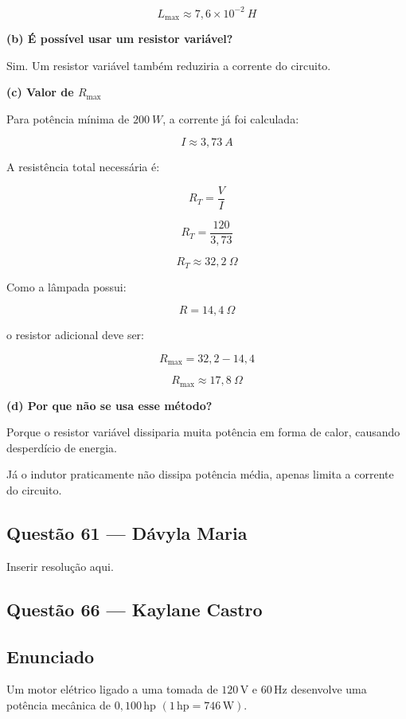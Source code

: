 \documentclass[12pt,a4paper]{article}
\begin{document}
\[
L_{\max}\approx7,6\times10^{-2}\ H
\]

\vspace{0.5cm}

\textbf{(b) É possível usar um resistor variável?}

Sim. Um resistor variável também reduziria a corrente do circuito.

\vspace{0.5cm}

\textbf{(c) Valor de \(R_{\max}\)}

Para potência mínima de \(200\ W\), a corrente já foi calculada:

\[
I\approx3,73\ A
\]

A resistência total necessária é:

\[
R_T=\frac{V}{I}
\]

\[
R_T=\frac{120}{3,73}
\]

\[
R_T\approx32,2\ \Omega
\]

Como a lâmpada possui:

\[
R=14,4\ \Omega
\]

o resistor adicional deve ser:

\[
R_{\max}=32,2-14,4
\]

\[
R_{\max}\approx17,8\ \Omega
\]

\vspace{0.5cm}

\textbf{(d) Por que não se usa esse método?}

Porque o resistor variável dissiparia muita potência em forma de calor, causando desperdício de energia.

Já o indutor praticamente não dissipa potência média, apenas limita a corrente do circuito.

\subsection{Questão 61 — Dávyla Maria}
Inserir resolução aqui.

\subsection{Questão 66 — Kaylane Castro}
\subsection*{Enunciado}

Um motor elétrico ligado a uma tomada de $120\,\text{V}$ e
$60\,\text{Hz}$ desenvolve uma potência mecânica de
$0,100\,\text{hp}$ $(1\,\text{hp}=746\,\text{W})$.
\end{document}

